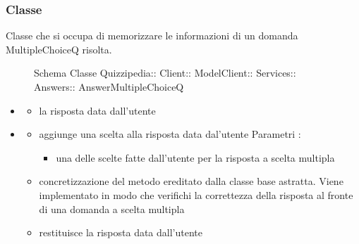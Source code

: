 \subsubsection{Classe }
Classe che si occupa di memorizzare le informazioni di un domanda MultipleChoiceQ risolta.
\begin{figure}[H]
\centering
\noindent{}
\caption[Schema Classe AnswerMultipleChoiceQ]{Schema Classe Quizzipedia:: Client:: ModelClient:: Services:: Answers:: AnswerMultipleChoiceQ}
\end{figure}
\begin{itemize}
\item {}
\begin{itemize}
\item {}
\newline
la risposta data dall'utente
\end{itemize}
\item {}
\begin{itemize}
\item {}
\newline
aggiunge una scelta alla risposta data dal'utente
\newline
Parametri :
\begin{itemize}
\item {}
\newline
una delle scelte fatte dall'utente per la risposta a scelta multipla
\end{itemize}
\item {}
\newline
concretizzazione del metodo ereditato dalla classe base astratta. Viene implementato in modo che verifichi la correttezza della risposta al fronte di una domanda a scelta multipla
\newline
\item {}
\newline
restituisce la risposta data dall'utente
\newline
\end{itemize}
\end{itemize}
